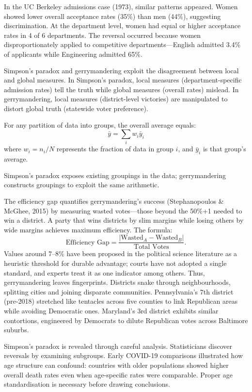 \vspace{1em}

In the UC Berkeley admissions case (1973), similar patterns appeared. Women showed lower overall acceptance rates (35\%) than men (44\%), suggesting discrimination. At the department level, women had equal or higher acceptance rates in 4 of 6 departments. The reversal occurred because women disproportionately applied to competitive departments—English admitted 3.4\% of applicants while Engineering admitted 65\%. 

Simpson’s paradox and gerrymandering exploit the disagreement between local and global measures. In Simpson's paradox, local measures (department-specific admission rates) tell the truth while global measures (overall rates) mislead. In gerrymandering, local measures (district-level victories) are manipulated to distort global truth (statewide voter preference).

For any partition of data into groups, the overall average equals:
\[
\bar{y} = \sum_{i} w_i \bar{y}_i
\]
where $w_i = n_i/N$ represents the fraction of data in group $i$, and $\bar{y}_i$ is that group's average.

Simpson’s paradox exposes existing groupings in the data; gerrymandering constructs groupings to exploit the same arithmetic.

The efficiency gap quantifies gerrymandering's success (Stephanopoulos \& McGhee, 2015) by measuring \QSOpen{}wasted\QSClose{} votes—those beyond the 50\%+1 needed to win a district. A party that wins districts by slim margins while losing others by wide margins achieves maximum efficiency. The formula:
\[
\text{Efficiency Gap} = \frac{|\text{Wasted}_A - \text{Wasted}_B|}{\text{Total Votes}}.
\]
Values around 7–8\% have been proposed in the political science literature as a heuristic threshold for durable advantage; courts have not adopted a single standard, and experts treat it as one indicator among others. Thus, gerrymandering leaves fingerprints. Districts snake through neighbourhoods, splitting cities and joining disparate communities. Pennsylvania's 7th district (pre-2018) stretched like tentacles across five counties to link Republican areas while avoiding Democratic ones. Maryland's 3rd district exhibits similar contortions, engineered by Democrats to dilute Republican votes across Baltimore suburbs. 

Simpson's paradox is revealed through careful analysis. Statisticians discover reversals by examining subgroups. Early COVID-19 comparisons illustrated how age structure can confound: countries with older populations showed higher overall death rates even when age-specific rates were comparable. Proper age standardisation is necessary before drawing conclusions.

